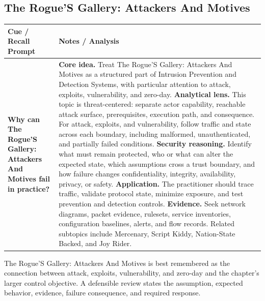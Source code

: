 \documentclass[11pt]{article}
\newcommand{\CornellHeader}{%
\rowcolor{Navy}\color{white}\bfseries Cue / Recall Prompt & \color{white}\bfseries Notes / Analysis\\\hline}
\newcommand{\CornellRow}[2]{%
\cellcolor{CueGray}\RaggedRight\textbf{#1} & \RaggedRight #2\\\hline}
\begin{document}
\subsection*{The Rogue'S Gallery: Attackers And Motives}
\begin{longtable}{>{\RaggedRight\arraybackslash}p{}|>{\RaggedRight\arraybackslash}p{}}
\CornellHeader
\CornellRow{Why can The Rogue'S Gallery: Attackers And Motives fail in practice?}{\textbf{Core idea.} Treat The Rogue'S Gallery: Attackers And Motives as a structured part of Intrusion Prevention and Detection Systems, with particular attention to attack, exploits, vulnerability, and zero-day. \textbf{Analytical lens.} This topic is threat-centered: separate actor capability, reachable attack surface, prerequisites, execution path, and consequence. For attack, exploits, and vulnerability, follow traffic and state across each boundary, including malformed, unauthenticated, and partially failed conditions. \textbf{Security reasoning.} Identify what must remain protected, who or what can alter the expected state, which assumptions cross a trust boundary, and how failure changes confidentiality, integrity, availability, privacy, or safety. \textbf{Application.} The practitioner should trace traffic, validate protocol state, minimize exposure, and test prevention and detection controls. \textbf{Evidence.} Seek network diagrams, packet evidence, rulesets, service inventories, configuration baselines, alerts, and flow records. Related subtopics include Mercenary, Script Kiddy, Nation-State Backed, and Joy Rider.}
\end{longtable}
\begin{topicsummary}
The Rogue'S Gallery: Attackers And Motives is best remembered as the connection between attack, exploits, vulnerability, and zero-day and the chapter's larger control objective. A defensible review states the assumption, expected behavior, evidence, failure consequence, and required response.
\end{topicsummary}
\end{document}
